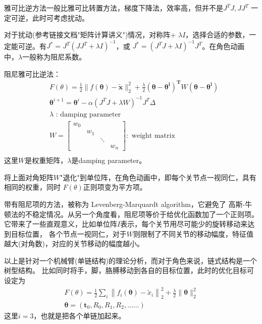 \documentclass[lang=cn,newtx,10pt,scheme=chinese]{elegantbook}
\begin{document}
雅可比逆方法一般比雅可比转置方法，梯度下降法，效率高，但并不是$J^T J, J J^T$
一定可逆，此时可考虑扰动。

对于扰动(参考链接文档"矩阵计算讲义")情况，对称阵$+$
$\lambda I$，选择合适的参数，一定能可逆。有$J^{*}=J^T (J J^T + \lambda I)^{-1}$，或
$J^{*}= (J^T J + \lambda I)^{-1}J^T$。在角色动画中，$\lambda$一般称为阻尼系数。

阻尼雅可比逆法：
\begin{equation}
  \begin{aligned}
  & F(\theta)=\frac{1}{2}\|f(\boldsymbol{\theta})-\widetilde{\boldsymbol{x}}\|_2^2+\frac{\lambda}{2}\left(\boldsymbol{\theta}-\boldsymbol{\theta}^{\boldsymbol{i}}\right)^{\boldsymbol{T}} W\left(\boldsymbol{\theta}-\boldsymbol{\theta}^{\boldsymbol{i}}\right) \\
  & \boldsymbol{\theta}^{i+1}=\boldsymbol{\theta}^i-\alpha\left(J^T J+\lambda W\right)^{-1} J^T \Delta \\
  & \lambda \text { : damping parameter } \\
  & W=\left[\begin{array}{llll}
  w_0 & & & \\
  & w_1 & & \\
  & & \ddots & \\
  & & & w_n
  \end{array}\right]: \text { weight matrix } \\
  &
  \end{aligned}
\end{equation}
这里$W$是权重矩阵，$\lambda$是damping parameter。

将上面对角矩阵$W$"退化"到单位阵，在角色动画中，即每个关节点一视同仁，具有相同的权重，同时
$F(\theta)$正则项变为平方项。

带有阻尼项的方法，被称为 Levenberg-Marquardt algorithm，它避免了
高斯-牛顿法的不稳定情况。从另一个角度看，阻尼项等价于给优化函数加了一个正则项。
它带来了一些直观意义，比如单位阵$I$表示，每个关节用尽可能少的旋转移动来达到目标位置，
各个节点一视同仁，对于$W$则限制了不同关节的移动幅度，特征值越大(对角数)，对应的关节移动的幅度越小。

以上是针对一个机械臂(单链结构)的理论分析，而对于角色来说，链式结构是一个树型结构。
比如同时将手，脚，胳膊移动到各自的目标位置，此时的优化目标可设定为
\begin{equation}
  \label{IK3.11}
  \begin{gathered}
  F(\theta)=\frac{1}{2} \sum_i\left\|f_i(\boldsymbol{\theta})-\tilde{x}_i\right\|_2^2+\frac{\lambda}{2}\|\boldsymbol{\theta}\|_2^2 \\
  \boldsymbol{\theta}=\left(\boldsymbol{t}_0, R_0, R_1, R_2, \ldots \ldots\right)
  \end{gathered}
\end{equation}
这里$i=3$，也就是把各个单链加起来。
\end{document}
